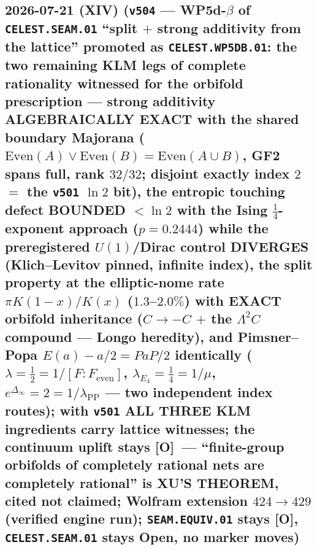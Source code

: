 \documentclass[11pt]{article}
\providecommand{\mO}{\textbf{[O]}}\providecommand{\mX}{\textbf{[X]}}
\begin{document}
\subsection*{2026-07-21 (XIV) (\texttt{v504} --- WP5d-$\beta$ of \texttt{CELEST.SEAM.01} ``split $+$ strong additivity from the lattice'' promoted as \texttt{CELEST.WP5DB.01}: the two remaining KLM legs of complete rationality witnessed for the orbifold prescription --- strong additivity ALGEBRAICALLY EXACT with the shared boundary Majorana ($\mathrm{Even}(A)\vee\mathrm{Even}(B)=\mathrm{Even}(A\cup B)$, GF2 spans full, rank $32/32$; disjoint exactly index $2$ $=$ the \texttt{v501} $\ln2$ bit), the entropic touching defect BOUNDED $<\ln2$ with the Ising $\tfrac14$-exponent approach ($p=0.2444$) while the preregistered $U(1)$/Dirac control DIVERGES (Klich--Levitov pinned, infinite index), the split property at the elliptic-nome rate $\pi K(1-x)/K(x)$ ($1.3$--$2.0\%$) with EXACT orbifold inheritance ($C\to-C$ $+$ the $\Lambda^2C$ compound --- Longo heredity), and Pimsner--Popa $E(a)-a/2=PaP/2$ identically ($\lambda=\tfrac12=1/[F{:}F_{\mathrm{even}}]$, $\lambda_{E_4}=\tfrac14=1/\mu$, $e^{\Delta_\infty}=2=1/\lambda_{\mathrm{PP}}$ --- two independent index routes); with \texttt{v501} ALL THREE KLM ingredients carry lattice witnesses; the continuum uplift stays \mO\ --- ``finite-group orbifolds of completely rational nets are completely rational'' is XU'S THEOREM, cited not claimed; Wolfram extension $424\to429$ (verified engine run); \texttt{SEAM.EQUIV.01} stays \mO, \texttt{CELEST.SEAM.01} stays Open, no marker moves)}
\end{document}

